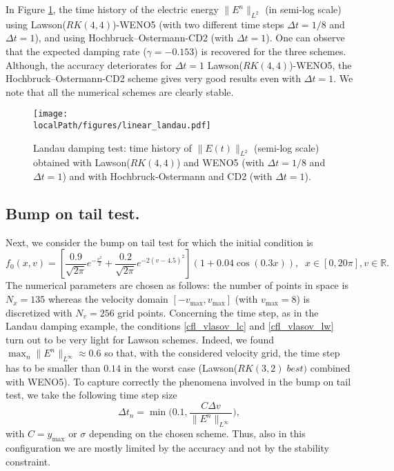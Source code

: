 In Figure \ref{ld}, the time history of the electric energy $\|E^n\|_{L^2}$ (in semi-log scale) 
{\color{black} using Lawson($RK(4, 4)$)-WENO5 (with two different time steps $\Delta t=1/8$ and $\Delta t=1$), 
and using Hochbruck--Ostermann-CD2 (with $\Delta t=1$).   
One can observe that the expected damping rate  
($\gamma=-0.153$) is recovered for the three schemes. Although, the accuracy deteriorates for $\Delta t=1$ Lawson($RK(4, 4)$)-WENO5, 
the Hochbruck--Ostermann-CD2 scheme gives very good results even with $\Delta t=1$. We note that all the numerical schemes are clearly stable. }
\begin{figure}[h]
	\centering
%	
\texttt{[image: \\localPath/figures/linear\_landau.pdf]}
	\caption{Landau damping test: time history of $\|E(t)\|_{L^2}$ (semi-log scale) obtained with Lawson($RK(4, 4)$) and WENO5 
	(with $\Delta t=1/8$ and $\Delta t=1$) {\color{black} and with Hochbruck-Ostermann and CD2 (with $\Delta t=1$)}.}
	\label{ld}
\end{figure}



\subsection{Bump on tail test.}

Next, we consider the bump on tail test for which the initial condition is 
$$
f_0(x, v) = \left[\frac{0.9}{\sqrt{2\pi}} e^{-\frac{v^2}{2}} + \frac{0.2}{\sqrt{2\pi}} e^{-2(v-4.5)^2} \right](1+0.04 \cos(0.3 x)), \;\; x\in [0, 20\pi], v\in \mathbb{R}. 
$$
The numerical parameters are chosen as follows: the number of points in space is $N_x=135$ 
whereas the velocity domain $[-v_{\max}, v_{\max}]$ (with $v_{\max}=8$) is discretized with $N_v=256$ grid points. 
Concerning the time step, 
as in the Landau damping example, the conditions \eqref{cfl_vlasov_lc} and \eqref{cfl_vlasov_lw} turn out to be very light for Lawson schemes. 
Indeed, we found $\max_n \| E^n \|_{L^\infty} \approx 0.6$ 
so that, with the considered velocity grid, the time step has to be smaller than $0.14$ 
in the worst case (Lawson($RK(3, 2) \; best)$ combined with WENO5). 
To capture correctly the phenomena involved in the bump on tail test, we take the following time step size
\begin{equation}
\label{dtbot}
\Delta t_n = \min \Big( 0.1,  \frac{C \Delta v}{\|E^n\|_{L^\infty}} \Big), 
\end{equation}
with $C=y_{\max}$ or $\sigma$ depending on the chosen scheme. Thus, also in this configuration we are mostly limited by the accuracy 
and not by the stability constraint.

